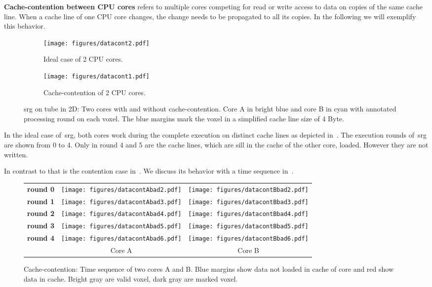 \documentclass{article}
\begin{document}
\textbf{Cache-contention between CPU cores} refers to multiple cores competing for read or write access to data on copies of the same cache line.
When a cache line of one CPU core changes, the change needs to be propagated to all its copies.
In the following we will exemplify this behavior.
\begin{figure}[h]
\centering
\begin{subfigure}[b]{0.5\linewidth}%
\centering
  \texttt{[image: figures/datacont2.pdf]}
  \caption{Ideal case of 2 CPU cores.}\label{fig:idealcase}%
\end{subfigure}%
\begin{subfigure}[b]{0.5\linewidth}%
\centering
  \texttt{[image: figures/datacont1.pdf]}
  \caption{Cache-contention of 2 CPU cores.}\label{fig:datacontention}%
\end{subfigure}%
  \caption{\acl{srg} on tube in 2D: Two cores with and without cache-contention. Core A in bright blue and core B in cyan with annotated processing round on each voxel. The blue margins mark the voxel in a simplified cache line size of 4 Byte.} \label{fig:datacontention_overview}
\end{figure}\par
In the ideal case of~\ac{srg}, both cores work during the complete execution on distinct cache lines as depicted in~.
The execution rounds of~\ac{srg} are shown from 0 to 4.
Only in round 4 and 5 are the cache lines, which are sill in the cache of the other core, loaded. However they are not written.\par
In contrast to that is the contention case in~.
We discuss its behavior with a time sequence in~.
\begin{figure}[h]
  \centering \vskip 0pt
\begin{tabular}{lcc}
  \textbf{round 0} & \texttt{[image: figures/datacontAbad2.pdf]} & \texttt{[image: figures/datacontBbad2.pdf]}\\
  \textbf{round 1} & \texttt{[image: figures/datacontAbad3.pdf]} & \texttt{[image: figures/datacontBbad3.pdf]}\\
  \textbf{round 2} & \texttt{[image: figures/datacontAbad4.pdf]} & \texttt{[image: figures/datacontBbad4.pdf]}\\
  \textbf{round 3} & \texttt{[image: figures/datacontAbad5.pdf]} & \texttt{[image: figures/datacontBbad5.pdf]}\\
  \textbf{round 4} & \texttt{[image: figures/datacontAbad6.pdf]} & \texttt{[image: figures/datacontBbad6.pdf]}\\
  & Core A & Core B
\end{tabular}
  \caption{Cache-contention: Time sequence of two cores A and B. Blue margins show data not loaded in cache of core and red show data in cache. Bright gray are valid voxel, dark gray are marked voxel.}\label{fig:sequence_contention}
\end{figure}
\end{document}

